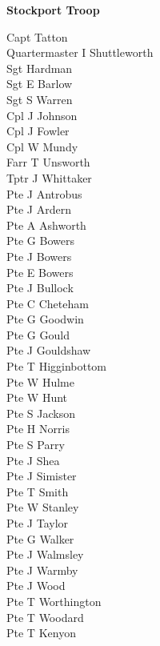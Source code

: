 \begin{center}
  \Large
  \textbf{Stockport Troop}
\end{center}

\begin{multicols}{2}
  \noindent
  Capt Tatton \\
  Quartermaster I Shuttleworth \\
  Sgt Hardman \\
  Sgt E Barlow \\
  Sgt S Warren \\
  Cpl J Johnson \\
  Cpl J Fowler \\
  Cpl W Mundy \\
  Farr T Unsworth \\
  Tptr J Whittaker \\
  Pte J Antrobus \\
  Pte J Ardern \\
  Pte A Ashworth \\
  Pte G Bowers \\
  Pte J Bowers \\
  Pte E Bowers \\
  Pte J Bullock \\
  Pte C Cheteham \\
  Pte G Goodwin \\
  Pte G Gould \\
  Pte J Gouldshaw \\
  Pte T Higginbottom \\
  Pte W Hulme \\
  Pte W Hunt \\
  Pte S Jackson \\
  Pte H Norris \\
  Pte S Parry \\
  Pte J Shea \\
  Pte J Simister \\
  Pte T Smith \\
  Pte W Stanley \\
  Pte J Taylor \\
  Pte G Walker \\
  Pte J Walmsley \\
  Pte J Warmby \\
  Pte J Wood \\
  Pte T Worthington \\
  Pte T Woodard \\
  Pte T Kenyon \\
\end{multicols}
